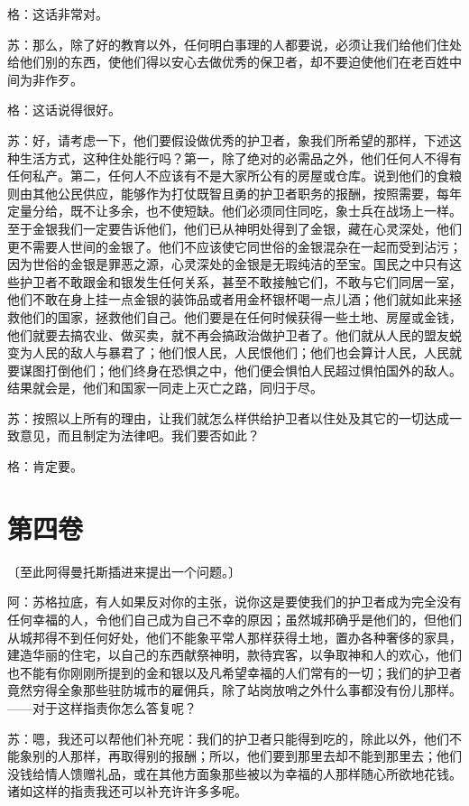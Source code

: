\documentclass[11pt,oneside]{book}
\begin{document}
\begin{common-format}
格：这话非常对。

苏：那么，除了好的教育以外，任何明白事理的人都要说，必须让我们给他们住处给他们别的东西，使他们得以安心去做优秀的保卫者，却不要迫使他们在老百姓中间为非作歹。

格：这话说得很好。

苏：好，请考虑一下，他们要假设做优秀的护卫者，象我们所希望的那样，下述这种生活方式，这种住处能行吗？第一，除了绝对的必需品之外，他们任何人不得有任何私产。第二，任何人不应该有不是大家所公有的房屋或仓库。说到他们的食粮则由其他公民供应，能够作为打仗既智且勇的护卫者职务的报酬，按照需要，每年定量分给，既不让多余，也不使短缺。他们必须同住同吃，象士兵在战场上一样。至于金银我们一定要告诉他们，他们已从神明处得到了金银，藏在心灵深处，他们更不需要人世间的金银了。他们不应该使它同世俗的金银混杂在一起而受到沾污；因为世俗的金银是罪恶之源，心灵深处的金银是无瑕纯洁的至宝。国民之中只有这些护卫者不敢跟金和银发生任何关系，甚至不敢接触它们，不敢与它们同居一室，他们不敢在身上挂一点金银的装饰品或者用金杯银杯喝一点儿酒；他们就如此来拯救他们的国家，拯救他们自己。他们要是在任何时候获得一些土地、房屋或金钱，他们就要去搞农业、做买卖，就不再会搞政治做护卫者了。他们就从人民的盟友蜕变为人民的敌人与暴君了；他们恨人民，人民恨他们；他们也会算计人民，人民就要谋图打倒他们；他们终身在恐惧之中，他们便会惧怕人民超过惧怕国外的敌人。结果就会是，他们和国家一同走上灭亡之路，同归于尽。

苏：按照以上所有的理由，让我们就怎么样供给护卫者以住处及其它的一切达成一致意见，而且制定为法律吧。我们要否如此？

格：肯定要。

    

\chapter{第四卷}
〔至此阿得曼托斯插进来提出一个问题。〕

阿：苏格拉底，有人如果反对你的主张，说你这是要使我们的护卫者成为完全没有任何幸福的人，令他们自己成为自己不幸的原因；虽然城邦确乎是他们的，但他们从城邦得不到任何好处，他们不能象平常人那样获得土地，置办各种奢侈的家具，建造华丽的住宅，以自己的东西献祭神明，款待宾客，以争取神和人的欢心，他们也不能有你刚刚所提到的金和银以及凡希望幸福的人们常有的一切；我们的护卫者竟然穷得全象那些驻防城市的雇佣兵，除了站岗放哨之外什么事都没有份儿那样。——对于这样指责你怎么答复呢？

苏：嗯，我还可以帮他们补充呢：我们的护卫者只能得到吃的，除此以外，他们不能象别的人那样，再取得别的报酬；所以，他们要到那里去却不能到那里去；他们没钱给情人馈赠礼品，或在其他方面象那些被以为幸福的人那样随心所欲地花钱。诸如这样的指责我还可以补充许许多多呢。


\end{common-format}
\end{document}
